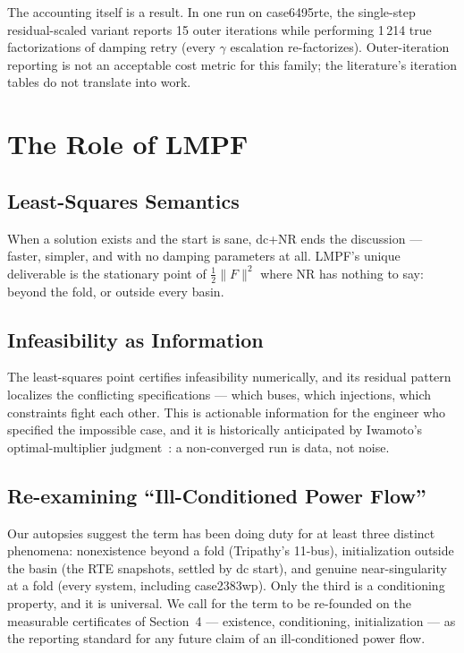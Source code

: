 \documentclass[11pt]{article}
\begin{document}
The accounting itself is a result. In one run on case6495rte, the
single-step residual-scaled variant reports 15 outer iterations while
performing 1\,214 true factorizations of damping retry (every $\gamma$
escalation re-factorizes). Outer-iteration reporting is not an
acceptable cost metric for this family; the literature's iteration tables
do not translate into work.


\section{The Role of LMPF}

\subsection{Least-Squares Semantics}

When a solution exists and the start is sane, dc+NR ends the discussion ---
faster, simpler, and with no damping parameters at all. LMPF's unique
deliverable is the stationary point of $\tfrac12\|F\|^2$ where NR has
nothing to say: beyond the fold, or outside every basin.

\subsection{Infeasibility as Information}

The least-squares point certifies infeasibility numerically, and its
residual pattern localizes the conflicting specifications --- which buses,
which injections, which constraints fight each other. This is actionable
information for the engineer who specified the impossible case, and it is
historically anticipated by Iwamoto's optimal-multiplier
judgment~\cite{iwamoto1981}: a non-converged run is data, not noise.

\subsection{Re-examining ``Ill-Conditioned Power Flow''}

Our autopsies suggest the term has been doing duty for at least three
distinct phenomena: nonexistence beyond a fold (Tripathy's 11-bus),
initialization outside the basin (the RTE snapshots, settled by dc start),
and genuine near-singularity at a fold (every system, including
case2383wp). Only the third is a conditioning property, and it is
universal. We call for the term to be re-founded on the measurable
certificates of Section~4 --- existence, conditioning, initialization ---
as the reporting standard for any future claim of an ill-conditioned power
flow.
\end{document}

